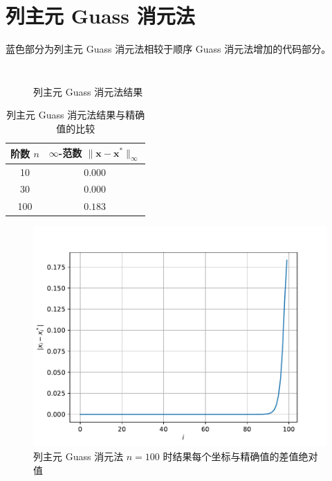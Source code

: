 \documentclass{sjtuarticle}
\begin{document}
\section{列主元 Guass 消元法}

蓝色部分为列主元 Guass 消元法相较于顺序 Guass 消元法增加的代码部分。

\inputminted[firstline=50,lastline=91,highlightlines=60-75]{python3}{main.py}

\begin{minipage}{0.5\textwidth}
    \begin{figure}[H]
        \centering
        \inputminted[firstline=35,lastline=57,fontsize=\tiny]{text}{stdout.txt}
        \caption{列主元 Guass 消元法结果}
    \end{figure}
\end{minipage}
\begin{minipage}{0.45\textwidth}
    \begin{table}[H]
        \centering
        \caption{列主元 Guass 消元法结果与精确值的比较}
        \begin{tabular}{cc}
            \toprule
            阶数 $n$ & $\infty$-范数 $\lVert \bm{x}-\bm{x}^* \rVert_\infty$ \\
            \midrule
            10  & $0.000$      \\
            30  & $0.000$      \\
            100 & $0.183$\\
            \bottomrule
        \end{tabular}
    \end{table}
    \vspace*{-0.75cm}
    \begin{figure}[H]
        \centering
        \includegraphics[width=\textwidth]{pic/PivotGuassSolver.pdf}
        \caption{列主元 Guass 消元法 $n=100$ 时结果每个坐标与精确值的差值绝对值}
    \end{figure}
\end{minipage}
\end{document}
